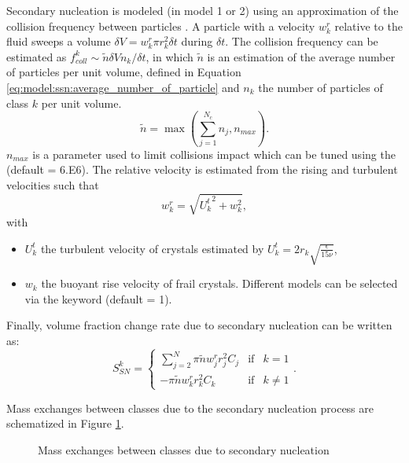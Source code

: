 Secondary nucleation is modeled  (in model 1 or 2) using an approximation of the
collision frequency between particles \cite{Omstedt_1994}.
A particle with a velocity $w^r_k$ relative to the fluid sweeps a volume $\delta V = w^r_k \pi r_k^2 \delta t$
during $\delta t$.
The collision frequency can be estimated as $f^k_{coll} \sim \widetilde{n} \delta V n_k / \delta t$,
in which $\widetilde{n}$ is an estimation of the average number of particles per unit volume, defined in Equation \eqref{eq:model:ssn:average_number_of_particle}
and $n_k$ the number of particles of class $k$ per unit volume.
\begin{equation}
\widetilde{n}=\max \left( \sum_{j=1}^{N_c} n_j, n_{max}\right).
\label{eq:model:ssn:average_number_of_particle}
\end{equation}
$n_{max}$ is a parameter used to limit collisions impact which
can be tuned using the  (default = 6.E6).
The relative velocity is estimated from the rising and turbulent velocities such that
\begin{equation}
w^r_k= \sqrt{ {U^t_k}^2+ w_k^2 },
\label{eq:model:ssn:relative_velocity}
\end{equation}
with
\begin{itemize}
	\item $U^t_k$ the turbulent velocity of crystals estimated by $U^t_k= 2 r_k \sqrt{ \frac{\epsilon}{15 \nu} }$,
	\item $w_k$ the buoyant rise velocity of frail crystals. Different models can be selected via the keyword  (default = 1).
\end{itemize}
Finally, volume fraction change rate due to secondary nucleation can be written as:
\begin{equation}
S_{SN}^{k}=
\left\lbrace \begin{matrix}
\sum_{j=2}^{N} \pi \widetilde{n} w^r_j r_j^2 C_{j} & \text{if} & k=1 \\
-\pi \widetilde{n} w^r_k r_k^2 C_{k} & \text{if} & k \neq 1
\end{matrix} \right. .
\label{eq:model:ssn:source}
\end{equation}

Mass exchanges between classes due to the secondary nucleation process are schematized in Figure \ref{fig:secondary_nucleation}.

\begin{figure}[H]
    \begin{center}
    \end{center}
    \caption{Mass exchanges between classes due to secondary nucleation}
    \label{fig:secondary_nucleation}
\end{figure}


